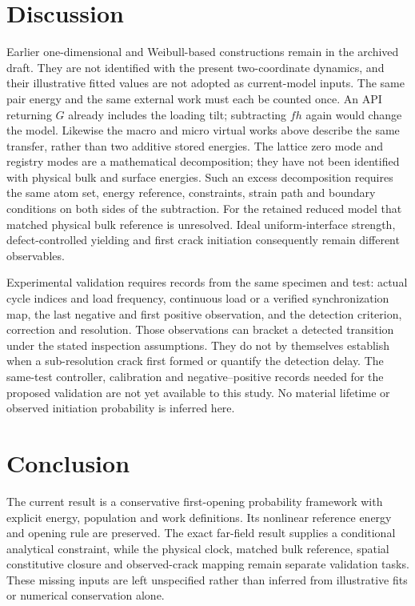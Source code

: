 \documentclass[11pt]{article}
\begin{document}
\section{Discussion}
Earlier one-dimensional and Weibull-based constructions remain in the archived
draft. They are not identified with the present two-coordinate dynamics, and
their illustrative fitted values are not adopted as current-model inputs.
The same pair energy and the same external work must each be counted once.
An API returning $G$ already includes the loading tilt; subtracting $fh$ again
would change the model. Likewise the macro and micro virtual works above
describe the same transfer, rather than two additive stored energies.
The lattice zero mode and registry modes are a mathematical decomposition;
they have not been identified with physical bulk and surface energies.
Such an excess decomposition requires the same atom set, energy reference,
constraints, strain path and boundary conditions on both sides of the subtraction.
For the retained reduced model that matched physical bulk reference is unresolved.
Ideal uniform-interface strength, defect-controlled yielding and first crack
initiation consequently remain different observables.

Experimental validation requires records from the same specimen and test:
actual cycle indices and load frequency, continuous load or a verified
synchronization map, the last negative and first positive observation,
and the detection criterion, correction and resolution.
Those observations can bracket a detected transition under the stated inspection
assumptions. They do not by themselves establish when a sub-resolution crack
first formed or quantify the detection delay. The same-test controller, calibration and negative--positive records
needed for the proposed validation are not yet available to this study.
No material lifetime or observed initiation probability is inferred here.

\section{Conclusion}
The current result is a conservative first-opening probability framework with
explicit energy, population and work definitions. Its nonlinear reference
energy and opening rule are preserved. The exact far-field result supplies
a conditional analytical constraint, while the physical clock, matched bulk
reference, spatial constitutive closure and observed-crack mapping remain
separate validation tasks. These missing inputs are left unspecified rather
than inferred from illustrative fits or numerical conservation alone.



\end{document}
